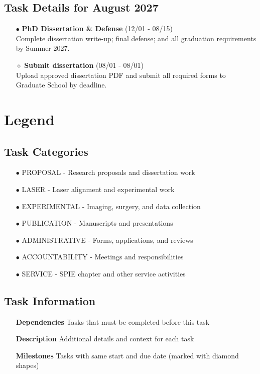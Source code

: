 \documentclass[landscape,a4paper]{article}
\begin{document}
\subsection{Task Details for August 2027}
\begin{itemize}[leftmargin=1cm]
    \item[\textcolor{other}{$\bullet$}] \textbf{PhD Dissertation \& Defense} (12/01 - 08/15)\\ Complete dissertation write-up; final defense; and all graduation requirements by Summer 2027.
    \item[\textcolor{other}{$\diamond$}] \textbf{Submit dissertation} (08/01 - 08/01)\\ Upload approved dissertation PDF and submit all required forms to Graduate School by deadline.
\end{itemize}

\section{Legend}

\subsection{Task Categories}
\begin{itemize}[leftmargin=2cm]
    \item[\textcolor{researchcore}{$\bullet$}] PROPOSAL - Research proposals and dissertation work
    \item[\textcolor{researchexp}{$\bullet$}] LASER - Laser alignment and experimental work
    \item[\textcolor{researchexp}{$\bullet$}] EXPERIMENTAL - Imaging, surgery, and data collection
    \item[\textcolor{researchout}{$\bullet$}] PUBLICATION - Manuscripts and presentations
    \item[\textcolor{administrative}{$\bullet$}] ADMINISTRATIVE - Forms, applications, and reviews
    \item[\textcolor{accountability}{$\bullet$}] ACCOUNTABILITY - Meetings and responsibilities
    \item[\textcolor{service}{$\bullet$}] SERVICE - SPIE chapter and other service activities
\end{itemize}

\subsection{Task Information}
\begin{itemize}[leftmargin=2cm]
    \item[\textbf{Dependencies}] Tasks that must be completed before this task
    \item[\textbf{Description}] Additional details and context for each task
    \item[\textbf{Milestones}] Tasks with same start and due date (marked with diamond shapes)
\end{itemize}
\end{document}
